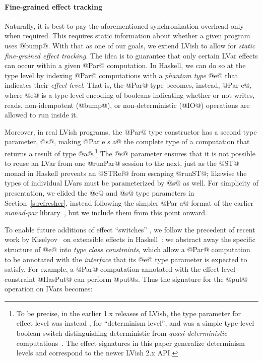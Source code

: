 \paragraph{Fine-grained effect tracking}

Naturally, it is best to pay the aforementioned synchronization
overhead only when required.  This requires static information about
whether a given program uses @bump@.  With that as one of our goals, 
we extend LVish
to allow for \emph{static fine-grained effect tracking}.  The idea is
to guarantee that only certain LVar effects can occur within a given
@Par@ computation.  In Haskell, we can do so at the type level
by indexing @Par@ computations with a \emph{phantom type} @e@ that
indicates their \emph{effect level}.  That is, the @Par@ type
 becomes, instead, @Par e@, where @e@ 
is a type-level encoding of booleans indicating whether or not writes,
reads, non-idempotent (@bump@), or non-deterministic (@IO@) operations
are allowed to run inside it.

Moreover, in real LVish programs, the @Par@ type constructor has a
second type parameter, @s@, making @Par e s a@ the complete type of a
computation that returns a result of type @a@.\footnote{To be precise,
  in the earlier 1.x releases of LVish, the  type parameter for
  effect level was instead , for ``determinism level'', and was
  a simple type-level boolean switch distinguishing deterministic from
  {\em quasi-deterministic}  computations~\cite{Freeze-paper}.
  The effect signatures in this paper generalize determinism levels
  and correspond to the newer LVish 2.x API.}  The @s@ parameter
ensures that it is not possible to reuse an LVar from one @runPar@
session to the next, just as the @ST@ monad in Haskell prevents an
@STRef@ from escaping @runST@; likewise the types of individual LVars
must be parameterized by @s@ as well.  For simplicity of presentation,
we elided the @e@ and @s@ type parameters in
Section~\ref{s:refresher}, instead following the simpler @Par a@
format of the earlier \emph{monad-par} library~\cite{monad-par}, but
we include them from this point onward.

To enable future additions of effect ``switches'' , we follow the precedent of recent work by Kiselyov \etal~on
extensible effects in Haskell~\cite{oleg-amr-haskell-2013}: we
abstract away the specific structure of @e@ into \emph{type class
  constraints}, which allow a @Par@ computation to be annotated with
the \emph{interface} that its @e@ type parameter is expected to
satisfy.  For example, a @Par@ computation annotated with the effect
level constraint @HasPut@ can perform @put@s.  Thus the signature for
the @put@ operation on IVars becomes:

